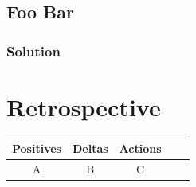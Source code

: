 \documentclass[onecolumn, draftclsnofoot,10pt, compsoc]{IEEEtran}
\begin{document}
		\subsection{Foo Bar}
			\subsubsection{Solution}

	\section{Retrospective}
	\begin{tabular}{ |c|c|c|c|c| }
		\hline
		Positives & Deltas & Actions \\
		\hline
		A & B & C \\
		\hline
	\end{tabular}
\end{document}
